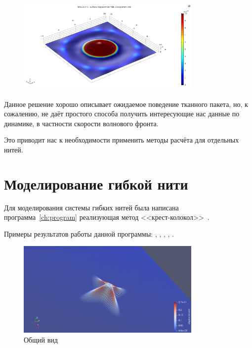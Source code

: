 \begin{figure}[H]
    \centering
    \caption{}
    \label{pic:comsol-example-1}
    \includegraphics[width=0.8\textwidth]{img/comsol/example_1.png}
\end{figure}

Данное решение хорошо описывает ожидаемое поведение тканного пакета, но, к сожалению, не даёт простого способа
получить интересующие нас данные по динамике, в частности скорости волнового фронта.

Это приводит нас к необходимости применить методы расчёта для отдельных нитей.

\section{Моделирование гибкой нити}\label{sec:model-fibers}
Для моделирования системы гибких нитей была написана программа~\ref{ch:program} реализующая метод
<<крест-колокол>>~\cite{rakhmatulin}.

Примеры результатов работы данной программы: ,
, ,
, .

\begin{figure}[H]
    \centering
    \caption{Общий вид}
    \label{pic:fiber-example-overview}
    \includegraphics[width=0.8\textwidth]{img/fiber/example_overview.png}
\end{figure}

